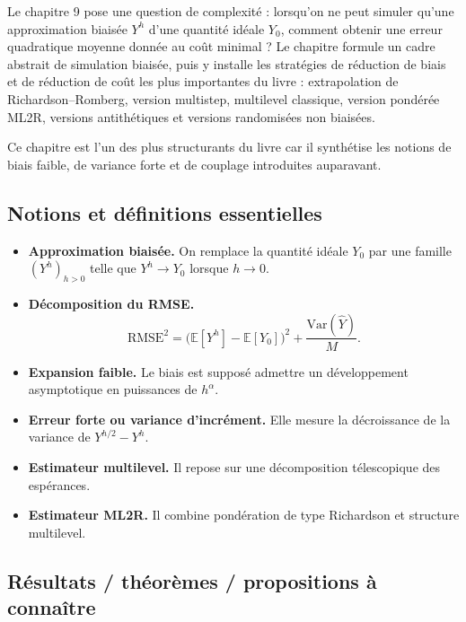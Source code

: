 \documentclass[11pt,a4paper]{article}
\newcommand{\E}{\mathbb{E}}
\begin{document}
Le chapitre 9 pose une question de complexité : lorsqu'on ne peut simuler qu'une approximation biaisée $Y^h$ d'une quantité idéale $Y_0$, comment obtenir une erreur quadratique moyenne donnée au coût minimal ? Le chapitre formule un cadre abstrait de simulation biaisée, puis y installe les stratégies de réduction de biais et de réduction de coût les plus importantes du livre : extrapolation de Richardson--Romberg, version multistep, multilevel classique, version pondérée ML2R, versions antithétiques et versions randomisées non biaisées.

Ce chapitre est l'un des plus structurants du livre car il synthétise les notions de biais faible, de variance forte et de couplage introduites auparavant.

\subsection{Notions et définitions essentielles}

\begin{itemize}
  \item \textbf{Approximation biaisée.} On remplace la quantité idéale $Y_0$ par une famille $(Y^h)_{h>0}$ telle que $Y^h\to Y_0$ lorsque $h\to0$.
  \item \textbf{Décomposition du RMSE.}
  \[
    \mathrm{RMSE}^2 = \bigl(\E[Y^h]-\E[Y_0]\bigr)^2 + \frac{\mathrm{Var}(\widehat Y)}{M}.
  \]
  \item \textbf{Expansion faible.} Le biais est supposé admettre un développement asymptotique en puissances de $h^\alpha$.
  \item \textbf{Erreur forte ou variance d'incrément.} Elle mesure la décroissance de la variance de $Y^{h/2}-Y^h$.
  \item \textbf{Estimateur multilevel.} Il repose sur une décomposition télescopique des espérances.
  \item \textbf{Estimateur ML2R.} Il combine pondération de type Richardson et structure multilevel.
\end{itemize}

\subsection{Résultats / théorèmes / propositions à connaître}
\end{document}
